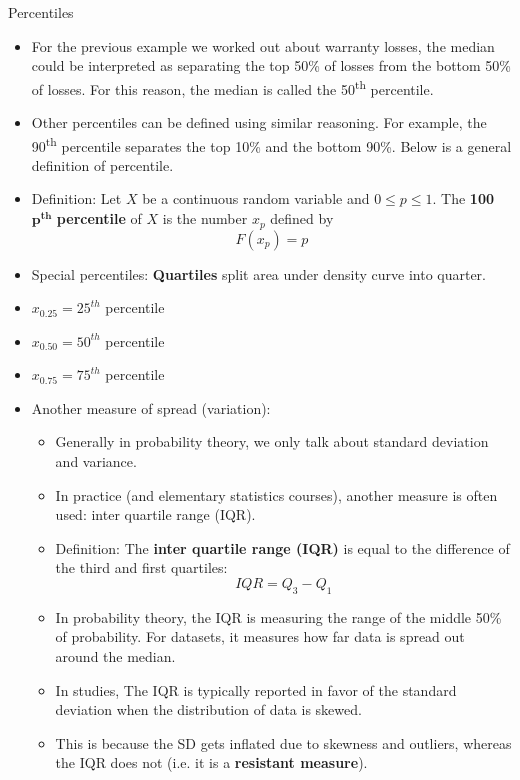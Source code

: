 \documentclass{article}
\begin{document}
Percentiles\bigskip
\begin{itemize}
    \item For the previous example we worked out about warranty losses, the median could be interpreted as separating the top 50\% of losses from the bottom 50\% of losses. For this reason, the median is called the 50\textsuperscript{th} percentile.
    \item[] Other percentiles can be defined using similar reasoning. For example, the 90\textsuperscript{th} percentile separates the top 10\% and the bottom 90\%. Below is a general definition of percentile.\bigskip
    \item Definition: Let $X$ be a continuous random variable and $0 \le p \le 1$. The \textbf{100}$\boldsymbol{p^{th}}$ \textbf{percentile} of $X$ is the number $x_p$ defined by
    \[F(x_p) = p\]
     \item Special percentiles: \hspace{20pt} \textbf{Quartiles} split area under density curve into quarter.
     \item[] $x_{0.25} = 25^{th}$ percentile
     \item[] $x_{0.50} = 50^{th}$ percentile
     \item[] $x_{0.75} = 75^{th}$ percentile\smallskip
     \item Another measure of spread (variation):
     \begin{itemize}
         \item Generally in probability theory, we only talk about standard deviation and variance.
         \item In practice (and elementary statistics courses), another measure is often used: inter quartile range (IQR).
         \item Definition: The \textbf{inter quartile range (IQR)} is equal to the difference of the third and first quartiles:
         \[IQR = Q_3 - Q_1\]
         \item[] In probability theory, the IQR is measuring the range of the middle 50\% of probability. For datasets, it measures how far data is spread out around the median.
         \item In studies, The IQR is typically reported in favor of the standard deviation when the distribution of data is skewed.
         \item[] This is because the SD gets inflated due to skewness and outliers, whereas the IQR does not (i.e. it is a \textbf{resistant measure}).
     \end{itemize}\bigskip

\end{itemize}
\end{document}
